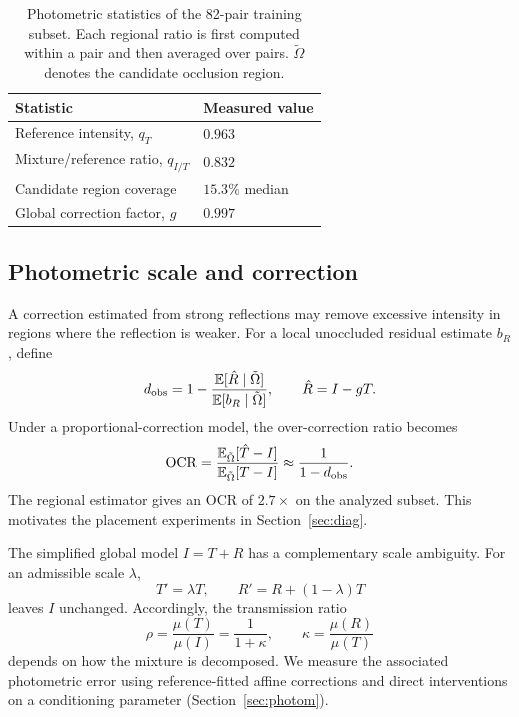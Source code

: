 \begin{table}[t]
\centering
\caption{Photometric statistics of the 82-pair training subset.
Each regional ratio is first computed within a pair and
then averaged over pairs. $\tilde\Omega$ denotes the
candidate occlusion region.}
\label{tab:terms}
\small
\begin{tabular}{@{}p{2.8cm}p{3.25cm}@{}}
\toprule
Statistic & Measured value \\
\midrule
Reference intensity, $q_T$ & $0.963$ \\
Mixture/reference ratio, $q_{I/T}$ & $0.832$ \\
Candidate region coverage & $15.3\%$ median \\
Global correction factor, $g$ & $0.997$ \\
\bottomrule
\end{tabular}
\end{table}

\subsection{Photometric scale and correction}

A correction estimated from strong reflections may remove
excessive intensity in regions where the reflection is weaker.
For a local unoccluded residual estimate $b_R$, define
\[
d_{\rm obs}=1-
\frac{\mathbb E[\hat R\mid\tilde\Omega]}
     {\mathbb E[b_R\mid\tilde\Omega]},
\qquad \hat R=I-gT.
\]
Under a proportional-correction model, the over-correction
ratio becomes
\begin{equation}
{\rm OCR}=
\frac{\mathbb E_{\tilde\Omega}[\hat T-I]}
     {\mathbb E_{\tilde\Omega}[T-I]}
\approx \frac{1}{1-d_{\rm obs}}.
\end{equation}
The regional estimator gives an OCR of $2.7\times$ on
the analyzed subset. This motivates the placement
experiments in Section~\ref{sec:diag}.

The simplified global model $I=T+R$ has a complementary
scale ambiguity. For an admissible scale $\lambda$,
\[
T'=\lambda T,\qquad R'=R+(1-\lambda)T
\]
leaves $I$ unchanged. Accordingly, the transmission ratio
\begin{equation}
\rho=\frac{\mu(T)}{\mu(I)}
=\frac{1}{1+\kappa},
\qquad
\kappa=\frac{\mu(R)}{\mu(T)}
\end{equation}
depends on how the mixture is decomposed. We measure
the associated photometric error using reference-fitted
affine corrections and direct interventions on a
conditioning parameter (Section~\ref{sec:photom}).

